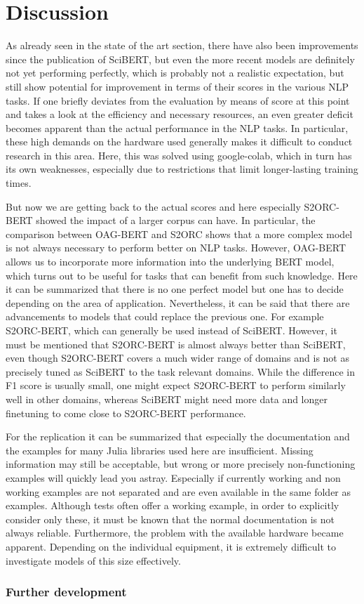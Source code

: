 \chapter{Discussion}
\color{red}
As already seen in the state of the art section, there have also been improvements since the publication of SciBERT, but even the more recent models are definitely not yet performing perfectly, which is probably not a realistic expectation, but still show potential for improvement in terms of their scores in the various NLP tasks. If one briefly deviates from the evaluation by means of score at this point and takes a look at the efficiency and necessary resources, an even greater deficit becomes apparent than the actual performance in the NLP tasks. In particular, these high demands on the hardware used generally makes it difficult to conduct research in this area. Here, this was solved using google-colab, which in turn has its own weaknesses, especially due to restrictions that limit longer-lasting training times. 

But now we are getting back to the actual scores and here especially S2ORC-BERT showed the impact of a larger corpus can have. In particular, the comparison between OAG-BERT and S2ORC shows that a more complex model is not always necessary to perform better on NLP tasks. However, OAG-BERT allows us to incorporate more information into the underlying BERT model, which turns out to be useful for tasks that can benefit from such knowledge. Here it can be summarized that there is no one perfect model but one has to decide depending on the area of application. Nevertheless, it can be said that there are advancements to models that could replace the previous one. For example S2ORC-BERT, which can generally be used instead of SciBERT. However, it must be mentioned that S2ORC-BERT is almost always better than SciBERT, even though S2ORC-BERT covers a much wider range of domains and is not as precisely tuned as SciBERT to the task relevant domains. While the difference in F1 score is usually small, one might expect S2ORC-BERT to perform similarly well in other domains, whereas SciBERT might need more data and longer finetuning to come close to S2ORC-BERT performance.  


For the replication it can be summarized that especially the documentation and the examples for many Julia libraries used here are insufficient. Missing information may still be acceptable, but wrong or more precisely non-functioning examples will quickly lead you astray. Especially if currently working and non working examples are not separated and are even available in the same folder as examples. Although tests often offer a working example, in order to explicitly consider only these, it must be known that the normal documentation is not always reliable. Furthermore, the problem with the available hardware became apparent. Depending on the individual equipment, it is extremely difficult to investigate models of this size effectively. 
\color{black}
\subsection{Further development}